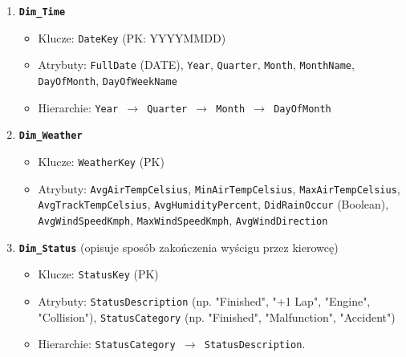\documentclass[a4paper,12pt]{article}
\begin{document}
\begin{enumerate}[label=\arabic*., wide, labelindent=0pt]
  \item \textbf{\texttt{Dim\_Time}}
        \begin{itemize}[label=\textendash, leftmargin=1em]
          \item Klucze: \texttt{DateKey} (PK: YYYYMMDD)
          \item Atrybuty: \texttt{FullDate} (DATE), \texttt{Year}, \texttt{Quarter}, \texttt{Month}, \texttt{MonthName}, \texttt{DayOfMonth}, \texttt{DayOfWeekName}
          \item Hierarchie: \texttt{Year \(\rightarrow\) Quarter \(\rightarrow\) Month \(\rightarrow\) DayOfMonth}
        \end{itemize}

  \item \textbf{\texttt{Dim\_Weather}}
        \begin{itemize}[label=\textendash, leftmargin=1em]
          \item Klucze: \texttt{WeatherKey} (PK)
          \item Atrybuty: \texttt{AvgAirTempCelsius}, \texttt{MinAirTempCelsius}, \texttt{MaxAirTempCelsius}, \texttt{AvgTrackTempCelsius}, \texttt{AvgHumidityPercent}, \texttt{DidRainOccur} (Boolean), \texttt{AvgWindSpeedKmph}, \texttt{MaxWindSpeedKmph}, \texttt{AvgWindDirection}
        \end{itemize}

  \item \textbf{\texttt{Dim\_Status}} (opisuje sposób zakończenia wyścigu przez kierowcę)
        \begin{itemize}[label=\textendash, leftmargin=1em]
          \item Klucze: \texttt{StatusKey} (PK)
          \item Atrybuty: \texttt{StatusDescription} (np. "Finished", "+1 Lap", "Engine", "Collision"), \texttt{StatusCategory} (np. "Finished", "Malfunction", "Accident")
          \item Hierarchie: \texttt{StatusCategory \(\rightarrow\) StatusDescription}.
        \end{itemize}
\end{enumerate}
\end{document}
